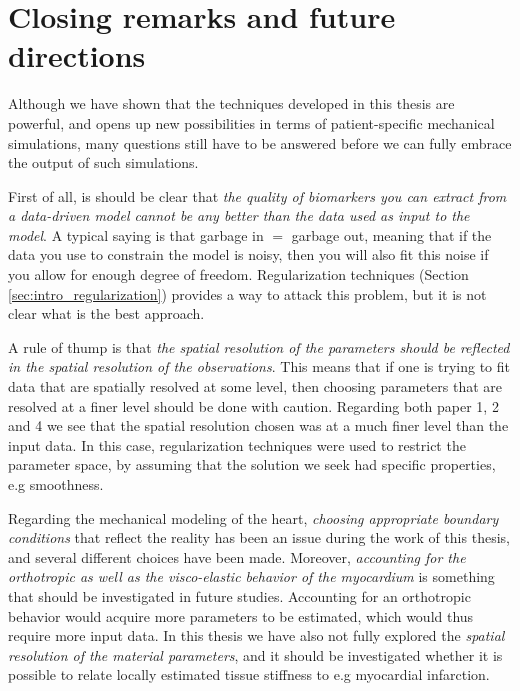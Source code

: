 \section{Closing remarks and future directions}

Although we have shown that the techniques developed in
this thesis are powerful, and opens up new possibilities in terms of
patient-specific mechanical simulations, many questions still have to
be answered before we can fully embrace the output of such simulations.

First of all, is should be clear that \emph{the
  quality of biomarkers you can extract from a data-driven
  model cannot be any better than the data used as input to the
  model}. A typical saying is that garbage in $=$ garbage out,
meaning that if the data you use to constrain the model is noisy, then
you will also fit this noise if you allow for enough degree of
freedom. Regularization techniques (Section
\ref{sec:intro_regularization}) provides a way to attack this problem,
but it is not clear what is the best approach.

A rule of thump is that \emph{the spatial resolution of the parameters should be
  reflected in the spatial resolution of the observations}. This means
that if one is trying to fit data that are spatially resolved at some level,
then choosing parameters that are resolved at a finer level should be
done with caution. Regarding both paper 1, 2 and 4 we see that the
spatial resolution chosen was at a much finer level than the input
data. In this case, regularization techniques were used to restrict the
parameter space, by assuming that the solution we seek had specific
properties, e.g smoothness.

Regarding the mechanical modeling of the heart, 
\emph{choosing appropriate boundary conditions} that reflect the reality has
been an issue during the work of this thesis, and several different
choices have been made. Moreover, \emph{accounting for the orthotropic as
well as the visco-elastic behavior of the myocardium} is something that should
be investigated in future studies. Accounting for an orthotropic
behavior would acquire more parameters to be estimated, which would
thus require more input data.
In this thesis we have also not fully
explored the \emph{spatial resolution of the material parameters}, and it
should be investigated whether it is possible to relate locally estimated
tissue stiffness to e.g myocardial infarction.

